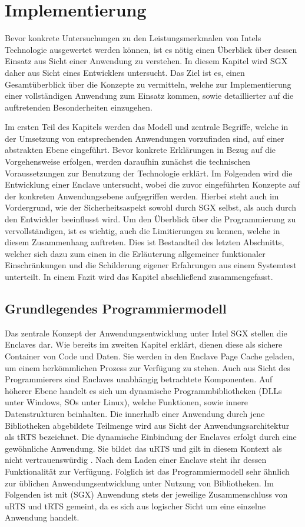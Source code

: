 
\chapter{Implementierung}

Bevor konkrete Untersuchungen zu den Leistungsmerkmalen von Intels Technologie ausgewertet werden können, ist es nötig einen Überblick über dessen Einsatz aus Sicht einer Anwendung zu verstehen. In diesem Kapitel wird \ac{SGX} daher aus Sicht eines Entwicklers untersucht. Das Ziel ist es, einen Gesamtüberblick über die Konzepte zu vermitteln, welche zur Implementierung einer vollständigen Anwendung zum Einsatz kommen, sowie detaillierter auf die auftretenden Besonderheiten einzugehen.

Im ersten Teil des Kapitels werden das Modell und zentrale Begriffe, welche in der Umsetzung von entsprechenden Anwendungen vorzufinden sind, auf einer abstrakten Ebene eingeführt. Bevor konkrete Erklärungen in Bezug auf die Vorgehensweise erfolgen, werden daraufhin zunächst die technischen Voraussetzungen zur Benutzung der Technologie erklärt. Im Folgenden wird die Entwicklung einer Enclave untersucht, wobei die zuvor eingeführten Konzepte auf der konkreten Anwendungsebene aufgegriffen werden. Hierbei steht auch im Vordergrund, wie der Sicherheitsaspekt sowohl durch \ac{SGX} selbst, als auch durch den Entwickler beeinflusst wird. Um den Überblick über die Programmierung zu vervollständigen, ist es wichtig, auch die Limitierungen zu kennen, welche in diesem Zusammenhang auftreten. Dies ist Bestandteil des letzten Abschnitts, welcher sich dazu zum einen in die Erläuterung allgemeiner funktionaler Einschränkungen und die Schilderung eigener Erfahrungen aus einem Systemtest unterteilt. In einem Fazit wird das Kapitel abschließend zusammengefasst.

\section{Grundlegendes Programmiermodell}

Das zentrale Konzept der Anwendungsentwicklung unter Intel \ac{SGX} stellen die Enclaves dar. Wie bereits im zweiten Kapitel erklärt, dienen diese als sichere Container von Code und Daten. Sie werden in den Enclave Page Cache geladen, um einem herkömmlichen Prozess zur Verfügung zu stehen. Auch aus Sicht des Programmierers sind Enclaves unabhängig betrachtete Komponenten. Auf höherer Ebene handelt es sich um dynamische Programmbibliotheken (\acp{DLL} unter Windows,  \acp{SO} unter Linux), welche Funktionen, sowie innere Datenstrukturen beinhalten. Die innerhalb einer Anwendung durch jene Bibliotheken abgebildete Teilmenge wird aus Sicht der Anwendungsarchitektur als \ac{tRTS} bezeichnet. Die dynamische Einbindung der Enclaves erfolgt durch eine gewöhnliche Anwendung. Sie bildet das \ac{uRTS} und gilt in diesem Kontext als nicht vertrauenswürdig \cite{WinGuide}. Nach dem Laden einer Enclave steht ihr dessen Funktionalität zur Verfügung. Folglich ist das Programmiermodell sehr ähnlich zur üblichen Anwendungsentwicklung unter Nutzung von Bibliotheken. Im Folgenden ist mit (\ac{SGX}) Anwendung stets der jeweilige Zusammenschluss von \ac{uRTS} und \ac{tRTS} gemeint, da es sich aus logischer Sicht um eine einzelne Anwendung handelt.

